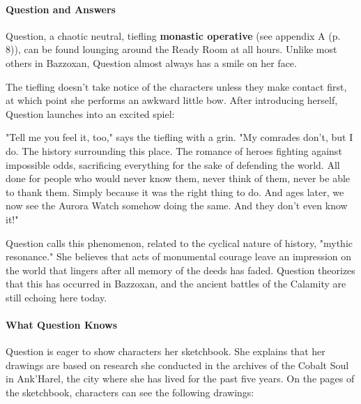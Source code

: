 \documentclass[letterpaper, 11pt, bg=full, twocolumn]{dndbook}
\begin{document}
\paragraph{Question and Answers}

Question, a chaotic neutral, tiefling \textbf{monastic operative} (see appendix A (p. 8)), can be found lounging around the Ready Room at all hours. Unlike most others in Bazzoxan, Question almost always has a smile on her face.

The tiefling doesn't take notice of the characters unless they make contact first, at which point she performs an awkward little bow. After introducing herself, Question launches into an excited spiel:

\begin{DndReadAloud}
"Tell me you feel it, too," says the tiefling with a grin. "My comrades don't, but I do. The history surrounding this place. The romance of heroes fighting against impossible odds, sacrificing everything for the sake of defending the world. All done for people who would never know them, never think of them, never be able to thank them. Simply because it was the right thing to do. And ages later, we now see the Aurora Watch somehow doing the same. And they don't even know it!"
\end{DndReadAloud}

Question calls this phenomenon, related to the cyclical nature of history, "mythic resonance." She believes that acts of monumental courage leave an impression on the world that lingers after all memory of the deeds has faded. Question theorizes that this has occurred in Bazzoxan, and the ancient battles of the Calamity are still echoing here today.

\paragraph{What Question Knows}

Question is eager to show characters her sketchbook. She explains that her drawings are based on research she conducted in the archives of the Cobalt Soul in Ank'Harel, the city where she has lived for the past five years. On the pages of the sketchbook, characters can see the following drawings:
\end{document}
